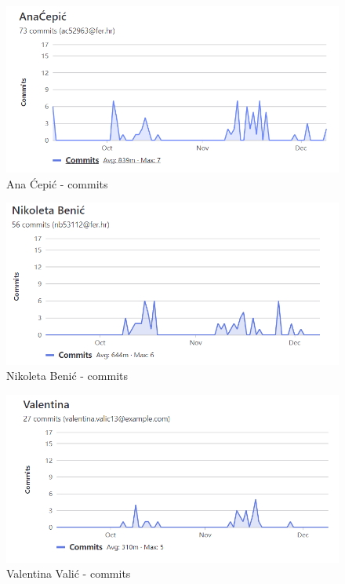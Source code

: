     \begin{figure}[H]
            \includegraphics[scale=1]{slike/commits_ana_cepic.png} %
			
			\centering
			\caption{Ana Ćepić - commits}
			\label{fig:Ana Ćepić commits}
			\end{figure}

    \begin{figure}[H]
            \includegraphics[scale=1]{slike/commits_nikoleta_benic.png} %
			
			\centering
			\caption{Nikoleta Benić - commits}
			\label{fig:Nikoleta Benić commits}
			\end{figure}

    \begin{figure}[H]
            \includegraphics[scale=1]{slike/commits_valentina_valic.png} %
			
			\centering
			\caption{Valentina Valić - commits}
			\label{fig:Valentina Valić commits}
			\end{figure}

